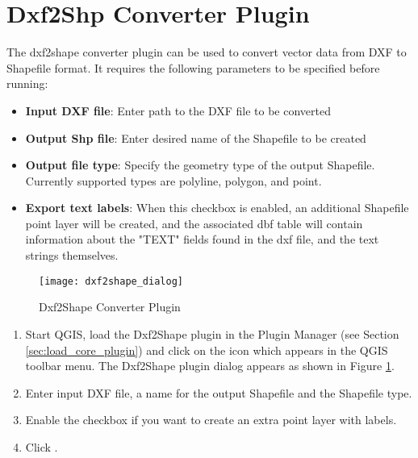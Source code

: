 
\section{Dxf2Shp Converter Plugin}\label{dxf2shape}


The dxf2shape converter plugin can be used to convert vector data from DXF to Shapefile 
format. It requires the following parameters to be specified before running:

\begin{itemize}
\item \textbf{Input DXF file}: Enter path to the DXF file to be converted
\item \textbf{Output Shp file}: Enter desired name of the Shapefile to be created
\item \textbf{Output file type}: Specify the geometry type of the output Shapefile. 
Currently supported types are polyline, polygon, and point.
\item \textbf{Export text labels}: When this checkbox is enabled, an additional Shapefile point layer will be created, and the associated dbf table will contain information about the "TEXT" fields found in the dxf file, and the text strings themselves.
\end{itemize}

\begin{figure}[ht]
   \centering
   \texttt{[image: dxf2shape\_dialog]}   
   \caption{Dxf2Shape Converter Plugin \nixcaption}\label{fig:dxf2shape_dialog}
\end{figure}


\begin{enumerate}
  \item Start QGIS, load the Dxf2Shape plugin in the Plugin Manager (see Section 
  \ref{sec:load_core_plugin}) and click on the  
  icon which appears in the QGIS toolbar menu. The Dxf2Shape plugin dialog appears as shown in Figure \ref{fig:dxf2shape_dialog}.
  \item Enter input DXF file, a name for the output Shapefile and the Shapefile type.
  \item Enable the  checkbox if you want to create an extra point layer with labels.
  \item Click . 
\end{enumerate}

\FloatBarrier
